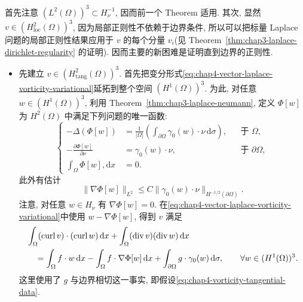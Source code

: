 \begin{Proof}
首先注意 $(L^2(\Omega))^3\subset H_\nu^{-1}$, 因而前一个 Theorem 适用. 其次, 显然 $v\in(H_{\mathrm{loc}}^2(\Omega))^3$, 因为局部正则性不依赖于边界条件, 所以可以把标量 Laplace 问题的局部正则性结果应用于 $v$ 的每个分量 $v_i$(见 Theorem~\ref{thm:chap3-laplace-dirichlet-regularity} 的证明). 因而主要的新困难是证明直到边界的正则性.

\begin{itemize}
\item 先建立 $v\in(H_{\mathrm{tang}}^2(\Omega))^3$. 首先把变分形式\eqref{eq:chap4-vector-laplace-vorticity-variational}延拓到整个空间 $(H^1(\Omega))^3$. 为此, 对任意 $w\in(H^1(\Omega))^3$, 利用 Theorem~\ref{thm:chap3-laplace-neumann}, 定义 $\Phi[w]$ 为 $H^2(\Omega)$ 中满足下列问题的唯一函数:
\[
 \left\{
 \begin{aligned}
  -\Delta(\Phi[w])
  &=\frac1{|\Omega|}\left(\int_{\partial\Omega}\gamma_0(w)\cdot\nu\,\mathrm d\sigma\right),&&\text{于 }\Omega,\\
  -\frac{\partial\Phi[w]}{\partial\nu}&=\gamma_0(w)\cdot\nu,&&\text{于 }\partial\Omega,\\
  \int_\Omega\Phi[w],\mathrm dx&=0.
 \end{aligned}
 \right.
\]
此外有估计
\begin{equation}
 \|\nabla\Phi[w]\|_{L^2}
 \leq C\|\gamma_0(w)\cdot\nu\|_{H^{-1/2}(\partial\Omega)}.
 \label{eq:chap4-vorticity-normal-lifting-estimate}
\end{equation}
注意, 对任意 $w\in H_\nu$ 有 $\nabla\Phi[w]=0$. 在\eqref{eq:chap4-vector-laplace-vorticity-variational}中使用 $w-\nabla\Phi[w]$, 得到 $v$ 满足
\begin{align}
 &\int_\Omega(\operatorname{curl}v)\cdot(\operatorname{curl}w)\,\mathrm dx
 +\int_\Omega(\operatorname{div}v)(\operatorname{div}w)\,\mathrm dx\notag\\
 &\quad=\int_\Omega f\cdot w\,\mathrm dx
 -\int_\Omega f\cdot\nabla\Phi[w]\,\mathrm dx
 +\int_{\partial\Omega}g\cdot\gamma_0(w)\,\mathrm d\sigma,
 \qquad\forall w\in(H^1(\Omega))^3.
 \label{eq:chap4-vorticity-extended-variational}
\end{align}
这里使用了 $g$ 与边界相切这一事实, 即假设\eqref{eq:chap4-vorticity-tangential-data}.


\end{itemize}
\end{Proof}
